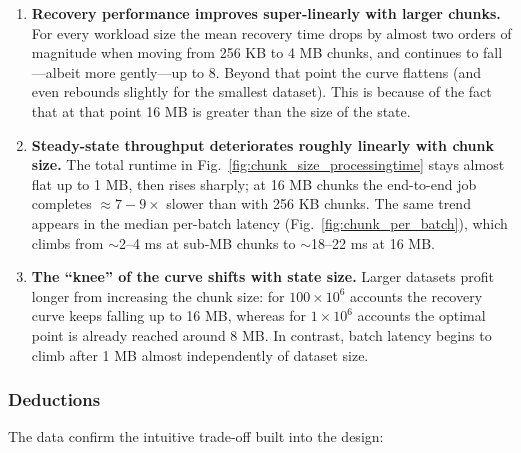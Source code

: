 \documentclass[conference]{IEEEtran}
\begin{document}
\begin{enumerate}
  \item \textbf{Recovery performance improves super-linearly with larger chunks.}
        For every workload size the mean recovery time drops by almost two
        orders of magnitude when moving from 256 KB to
        4 MB chunks, and continues to fall—albeit more gently—up to
        8.  Beyond that point the curve flattens (and even
        rebounds slightly for the smallest dataset). This is because of the fact that at that point 16 MB is greater than the size of the state.
  \item \textbf{Steady-state throughput deteriorates roughly linearly with
        chunk size.}
        The total runtime in Fig.~\ref{fig:chunk_size_processingtime} stays
        almost flat up to 1 MB, then rises sharply; at
        16 MB chunks the end-to-end job completes \(\approx7{-}9\times\)
        slower than with 256 KB chunks. The same trend appears
        in the median per-batch latency (Fig.~\ref{fig:chunk_per_batch}), which climbs from {\(\sim\)2–4 ms} at sub-MB chunks to {\(\sim\)18–22 ms} at 16 MB.
  \item \textbf{The “knee” of the curve shifts with state size.}
        Larger datasets profit longer from increasing the chunk size: for
        \(100\times10^{6}\) accounts the recovery curve keeps falling up to
        16 MB, whereas for \(1\times10^{6}\) accounts the optimal
        point is already reached around 8 MB.  In contrast, batch
        latency begins to climb after 1 MB almost
        independently of dataset size.
\end{enumerate}

\subsubsection{Deductions}
The data confirm the intuitive trade-off built into the design:
\end{document}
